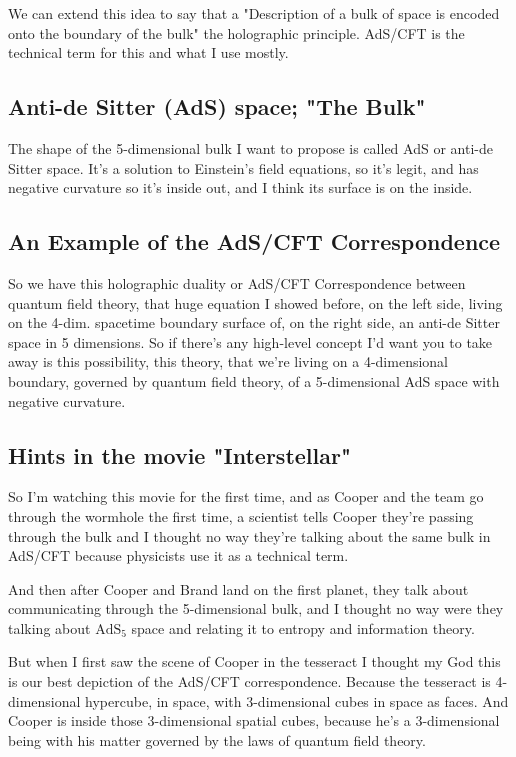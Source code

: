 \documentclass[10pt]{amsart}
\begin{document}
We can extend this idea to say that a "Description of a bulk of space is encoded onto the boundary of the bulk" the holographic principle. AdS/CFT is the technical term for this and what I use mostly.

\subsection{Anti-de Sitter (AdS) space; "The Bulk"}

The shape of the 5-dimensional bulk I want to propose is called AdS or anti-de Sitter space. It's a solution to Einstein's field equations, so it's legit, and has negative curvature so it's inside out, and I think its surface is on the inside.

\subsection{An Example of the AdS/CFT Correspondence}

So we have this holographic duality or AdS/CFT Correspondence between quantum field theory, that huge equation I showed before, on the left side, living on the 4-dim. spacetime boundary surface of, on the right side, an anti-de Sitter space in 5 dimensions. So if there's any high-level concept I'd want you to take away is this possibility, this theory, that we're living on a 4-dimensional boundary, governed by quantum field theory, of a 5-dimensional AdS space with negative curvature.

\subsection{Hints in the movie "Interstellar"}

So I'm watching this movie for the first time, and as Cooper and the team go through the wormhole the first time, a scientist tells Cooper they're passing through the bulk and I thought no way they're talking about the same bulk in AdS/CFT because physicists use it as a technical term.

And then after Cooper and Brand land on the first planet, they talk about communicating through the 5-dimensional bulk, and I thought no way were they talking about $\text{AdS}_5$ space and relating it to entropy and information theory.

But when I first saw the scene of Cooper in the tesseract I thought my God this is our best depiction of the AdS/CFT correspondence. Because the tesseract is 4-dimensional hypercube, in space, with 3-dimensional cubes in space as faces. And Cooper is inside those 3-dimensional spatial cubes, because he's a 3-dimensional being with his matter governed by the laws of quantum field theory. 
\end{document}
